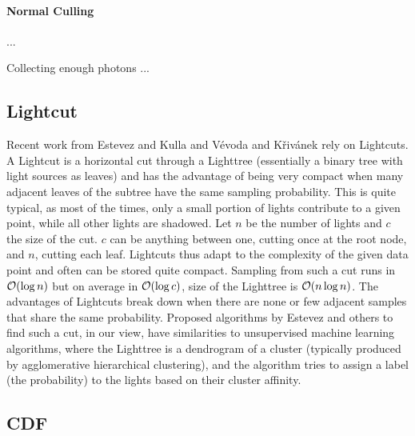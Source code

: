 \paragraph*{Normal Culling}
\label{ch:normalculling}
...

Collecting enough photons ...

\subsection{Lightcut}

Recent work from Estevez and Kulla \cite{Estevez} and Vévoda and Křivánek \cite{Vevoda} rely on Lightcuts. A Lightcut is a horizontal cut through a Lighttree (essentially a binary tree with light sources as leaves) and has the advantage of being very compact when many adjacent leaves of the subtree have the same sampling probability. This is quite typical, as most of the times, only a small portion of lights contribute to a given point, while all other lights are shadowed. Let $n$ be the number of lights and $c$ the size of the cut. $c$ can be anything between one, cutting once at the root node, and $n$, cutting each leaf. Lightcuts thus adapt to the complexity of the given data point and often can be stored quite compact. Sampling from such a cut runs in $\mathcal{O}(\log{n})$ but on average in $\mathcal{O}(\log{c})$, size of the Lighttree is $\mathcal{O}(n\log{n})$. The advantages of Lightcuts break down when there are none or few adjacent samples that share the same probability. Proposed algorithms by Estevez \cite{Estevez} and others to find such a cut, in our view, have similarities to unsupervised machine learning algorithms, where the Lighttree is a dendrogram of a cluster (typically produced by agglomerative hierarchical clustering), and the algorithm tries to assign a label (the probability) to the lights based on their cluster affinity. 

\subsection{CDF}

